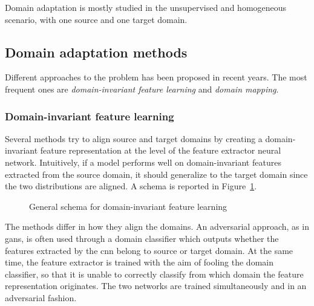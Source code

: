 \documentclass[%
    corpo=12pt,
    twoside,
    stile=classica,   
    tipotesi=magistrale,
    evenboxes,
    english
]{toptesi}
\begin{document}
Domain adaptation is mostly studied in the unsupervised and homogeneous scenario, with one source and one target domain.

\subsection{Domain adaptation methods}
Different approaches to the problem has been proposed in recent years. The most frequent ones are \textit{domain-invariant feature learning} and \textit{domain mapping}.

\subsubsection{Domain-invariant feature learning}
Several methods try to align source and target domains by creating a domain-invariant feature representation at the level of the feature extractor neural network. Intuitively, if a model performs well on domain-invariant features extracted from the source domain, it should generalize to the target domain since the two distributions are aligned. A schema is reported in Figure~\ref{fig:align}.

\begin{figure}[ht]
	\centering
	\caption{General schema for domain-invariant feature learning\cite{wilson2020survey}}
	\label{fig:align}
\end{figure}

The methods differ in how they align the domains. An adversarial approach, as in \glspl{gan}, is often used through a domain classifier which outputs whether the features extracted by the \gls{cnn} belong to source or target domain. At the same time, the feature extractor is trained with the aim of fooling the domain classifier, so that it is unable to correctly classify from which domain the feature representation originates. The two networks are trained simultaneously and in an adversarial fashion.
\end{document}
